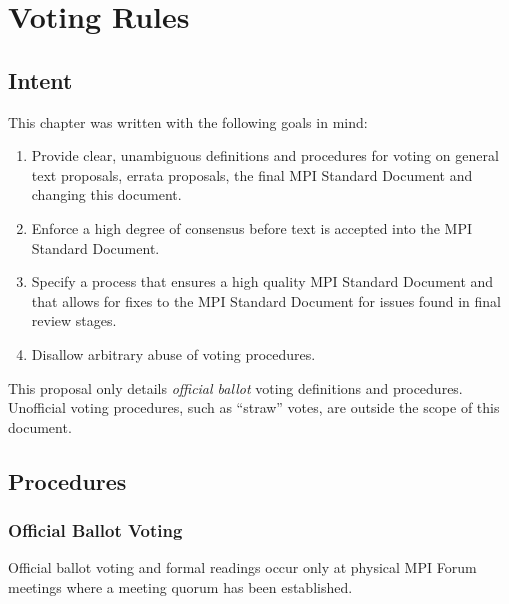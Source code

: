\chapter{Voting Rules}


\section{Intent}

This chapter was written with the following goals in mind:

\begin{enumerate}
\item Provide clear, unambiguous definitions and procedures for voting
  on general text proposals, errata proposals, the final
  MPI Standard Document and changing this document.
\item Enforce a high degree of consensus before text is accepted into
  the MPI Standard Document.
\item Specify a process that ensures a high quality
  MPI Standard Document and that allows for fixes to the
  MPI Standard Document for issues found in final review stages.
\item Disallow arbitrary abuse of voting procedures.
\end{enumerate}

This proposal only details {\em official ballot} voting definitions
and procedures.  Unofficial voting procedures, such as ``straw''
votes, are outside the scope of this document.


\section{Procedures}


\subsection{Official Ballot Voting}
\label{subsec:official-ballot-voting}

Official ballot voting and formal readings occur only at physical MPI
Forum meetings where a meeting quorum has been established.

